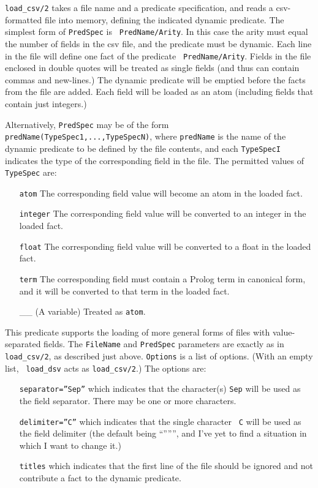 \begin{description}


{\tt load\_csv/2} takes a file name and a predicate specification, and
reads a csv-formatted file into memory, defining the indicated dynamic
predicate.  The simplest form of {\tt PredSpec} is {\tt
PredName/Arity}.  In this case the arity must equal the number of
fields in the csv file, and the predicate must be dynamic.  Each line
in the file will define one fact of the predicate {\tt
PredName/Arity}.  Fields in the file enclosed in double quotes will
be treated as single fields (and thus can contain commas and
new-lines.)  The dynamic predicate will be emptied before the facts
from the file are added.  Each field will be loaded as an atom
(including fields that contain just integers.)

Alternatively, {\tt PredSpec} may be of the form {\tt
predName(TypeSpec1,...,TypeSpecN)}, where {\tt predName} is the name
of the dynamic predicate to be defined by the file contents, and each
{\tt TypeSpecI} indicates the type of the corresponding field in the
file.  The permitted values of {\tt TypeSpec} are:
\begin{itemize}
\item[{\tt atom}] The corresponding field value will become an atom in
the loaded fact.
\item[{\tt integer}] The corresponding field value will be converted
to an integer in the loaded fact.
\item[{\tt float}] The corresponding field value will be converted to
a float in the loaded fact.
\item[{\tt term}] The corresponding field must contain a Prolog term in
canonical form, and it will be converted to that term in the loaded
fact. 
\item[\_\_] (A variable) Treated as {\tt atom}.
\end{itemize}


This predicate supports the loading of more general forms of files
with value-separated fields.  The {\tt FileName} and {\tt PredSpec}
parameters are exactly as in {\tt load\_csv/2}, as described just
above.  {\tt Options} is a list of options.  (With an empty list, {\tt
load\_dsv} acts as {\tt load\_csv/2}.)  The options are:
\begin{itemize}
\item[{\tt separator=''Sep''}] which indicates that the character(s) {\tt Sep}
will be used as the field separator.  There may be one or more
characters. 
\item[{\tt delimiter=''C''}] which indicates that the single character {\tt
C} will be used as the field delimiter (the default being ``'''''',
and I've yet to find a situation in which I want to change it.)
\item[{\tt titles}] which indicates that the first line of the file should
be ignored and not contribute a fact to the dynamic predicate.
\end{itemize}


\end{description}
